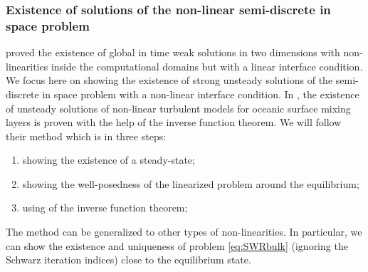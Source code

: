 \subsubsection{Existence of solutions of the
non-linear semi-discrete in space problem}
\cite{lions_mathematical_1995} proved the existence
of global in time weak solutions in
two dimensions with non-linearities inside the
computational domains but with a linear
interface condition.
We focus here on showing the existence of strong
unsteady solutions of the semi-discrete in space
problem with a non-linear interface condition.
In \citep{chacon-rebollo_existence_2014},
the existence of unsteady solutions of
non-linear turbulent models for oceanic surface mixing layers is
proven with the help of the inverse function theorem.
We will follow their method which is in three steps:
\begin{enumerate}
	\item showing the existence of a steady-state;
	\item showing the well-posedness of the linearized problem
	around the equilibrium;
	\item using of the inverse function theorem;
\end{enumerate}
The method can be generalized to other types of
non-linearities. In particular, we can show the existence and
uniqueness of problem \eqref{eq:SWRbulk}
(ignoring the Schwarz iteration indices) close to the
equilibrium state.
